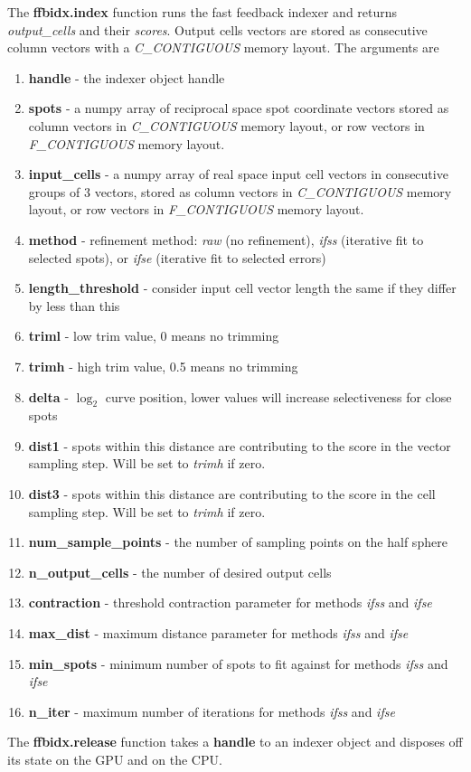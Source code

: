 \documentclass[a4paper,10pt]{article}
\begin{document}
The \textbf{ffbidx.index} function runs the fast feedback indexer and returns \emph{output\_cells} and their \emph{scores}. Output cells vectors are stored as consecutive column vectors with a \emph{C\_CONTIGUOUS} memory layout. The arguments are
%
\begin{enumerate}
 \item \textbf{handle} - the indexer object handle
 \item \textbf{spots} - a numpy array of reciprocal space spot coordinate vectors stored as column vectors in \emph{C\_CONTIGUOUS} memory layout, or row vectors in \emph{F\_CONTIGUOUS} memory layout.
 \item \textbf{input\_cells} - a numpy array of real space input cell vectors in consecutive groups of 3 vectors, stored as column vectors in \emph{C\_CONTIGUOUS} memory layout, or row vectors in \emph{F\_CONTIGUOUS} memory layout.
 \item \textbf{method} - refinement method: \emph{raw} (no refinement), \emph{ifss} (iterative fit to selected spots), or \emph{ifse} (iterative fit to selected errors)
 \item \textbf{length\_threshold} - consider input cell vector length the same if they differ by less than this
 \item \textbf{triml} - low trim value, 0 means no trimming
 \item \textbf{trimh} - high trim value, 0.5 means no trimming
 \item \textbf{delta} - $\log_2$ curve position, lower values will increase selectiveness for close spots
 \item \textbf{dist1} - spots within this distance are contributing to the score in the vector sampling step. Will be set to \emph{trimh} if zero.
 \item \textbf{dist3} - spots within this distance are contributing to the score in the cell sampling step. Will be set to \emph{trimh} if zero.
 \item \textbf{num\_sample\_points} - the number of sampling points on the half sphere
 \item \textbf{n\_output\_cells} - the number of desired output cells
 \item \textbf{contraction} - threshold contraction parameter for methods \emph{ifss} and \emph{ifse}
 \item \textbf{max\_dist} - maximum distance parameter for methods \emph{ifss} and \emph{ifse}
 \item \textbf{min\_spots} - minimum number of spots to fit against for methods \emph{ifss} and \emph{ifse}
 \item \textbf{n\_iter} - maximum number of iterations for methods \emph{ifss} and \emph{ifse}
\end{enumerate}
%
The \textbf{ffbidx.release} function takes a \textbf{handle} to an indexer object and disposes off its state on the GPU and on the CPU.
\end{document}
